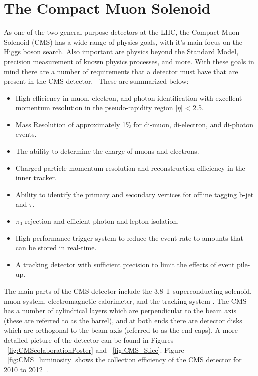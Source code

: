 

\section{The Compact Muon Solenoid}

As one of the two general purpose detectors at the LHC, the Compact Muon Solenoid (CMS) has a wide range of physics goals, with it's main focus on the Higgs boson search.  Also important are physics beyond the Standard Model, precision measurement of known physics processes, and more.  With these goals in mind there are a number of requirements that a detector must have that are present in the CMS detector.~\cite{Bayatian:922757} These are summarized below:

\begin{itemize}
 \item
   High efficiency in muon, electron, and photon identification with excellent momentum resolution in the pseudo-rapidity region $|\eta|$ < 2.5.
 \item 
   Mass Resolution of approximately 1\% for di-muon, di-electron, and di-photon events.
 \item 
   The ability to determine the charge of muons and electrons.
 \item
   Charged particle momentum resolution and reconstruction efficiency in the inner tracker. 
 \item
   Ability to identify the primary and secondary vertices for offline tagging b-jet and $\tau$.
 \item
  $\pi_0$ rejection and efficient photon and lepton isolation.
 \item
   High performance trigger system to reduce the event rate to amounts that can be stored in real-time.
 \item
   A tracking detector with sufficient precision to limit the effects of event pile-up.
\end{itemize}


  The main parts of the CMS detector include the 3.8 T superconducting solenoid, muon system, electromagnetic calorimeter, and the tracking system \cite{CMSExperiment}.  The CMS has a number of cylindrical layers which are perpendicular to the beam axis (these are referred to as the barrel), and at both ends there are detector disks which are orthogonal to the beam axis (referred to as the end-caps). A more detailed picture of the detector can be found in Figures ~\ref{fig:CMScolaborationPoster} and ~\ref{fig:CMS_Slice}.  Figure ~\ref{fig:CMS_luminosity} shows the collection efficiency of the CMS detector for 2010 to 2012~\cite{cms_lumi_plots}.



